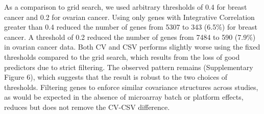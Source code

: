 \documentclass{bioinfo}
\begin{document}
  As a comparison to grid search, we used arbitrary thresholds of 0.4 for breast cancer and 0.2 for ovarian cancer. Using only genes with Integrative Correlation greater than 0.4 reduced the number of genes from 5307 to 343 (6.5\%) for breast cancer. A threshold of 0.2 reduced the number of genes 
  from 7484 to 590 (7.9\%) in ovarian cancer data. Both CV and CSV performs slightly worse using the fixed thresholds compared to the grid search, which results from the loss of good predictors due to strict filtering. The observed pattern remains (Supplementary Figure 6), which suggests that the result is robust to the two choices of thresholds. Filtering genes to enforce similar
  covariance structures across studies, as would be expected in the
  absence of microarray batch or platform effects, reduces but does not
  remove the CV-CSV difference.
  
\end{document}
